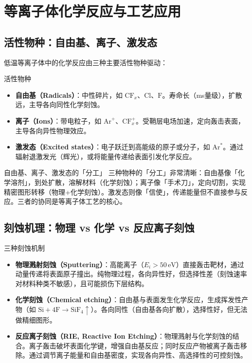 \documentclass[12pt,a4paper,openany,oneside]{book}
\begin{document}
\section{等离子体化学反应与工艺应用}

\subsection{活性物种：自由基、离子、激发态}

低温等离子体中的化学反应由三种主要活性物种驱动：

\begin{definition}{活性物种}{}{}
\label{def:active-species}
\begin{itemize}
\item \textbf{自由基（Radicals）}：中性碎片，如 $\mathrm{CF}_x$、$\mathrm{Cl}$、$\mathrm{F}$。寿命长（ms量级），扩散远，主导各向同性化学刻蚀。
\item \textbf{离子（Ions）}：带电粒子，如 $\mathrm{Ar}^+$、$\mathrm{CF}_x^+$。受鞘层电场加速，定向轰击表面，主导各向异性物理效应。
\item \textbf{激发态（Excited states）}：电子跃迁到高能级的原子或分子，如 $\mathrm{Ar}^*$。通过辐射退激发光（辉光），或将能量传递给表面引发化学反应。
\end{itemize}
\end{definition}

\begin{insight}{自由基、离子、激发态的「分工」}{}
三种物种的「分工」非常清晰：自由基像「化学溶剂」，到处扩散，溶解材料（化学刻蚀）；离子像「手术刀」，定向切割，实现精密图形转移（物理+化学刻蚀）。激发态则像「信使」，传递能量但不直接参与反应。三者的协同是等离子体工艺的核心。
\end{insight}

\subsection{刻蚀机理：物理 vs 化学 vs 反应离子刻蚀}

\begin{definition}{三种刻蚀机制}{}{}
\label{def:etching-mechanisms}
\begin{itemize}
\item \textbf{物理溅射刻蚀（Sputtering）}：高能离子（$E_i > 50\,\mathrm{eV}$）直接轰击靶材，通过动量传递将表面原子撞出。纯物理过程，各向异性好，但选择性差（刻蚀速率对材料种类不敏感），且可能损伤下层结构。
\item \textbf{化学刻蚀（Chemical etching）}：自由基与表面发生化学反应，生成挥发性产物（如 $\mathrm{Si} + 4\mathrm{F} \to \mathrm{SiF}_4\uparrow$）。各向同性（自由基各向扩散），选择性好，但无法做精细图形。
\item \textbf{反应离子刻蚀（RIE, Reactive Ion Etching）}：物理溅射与化学刻蚀的结合。离子轰击破坏表面化学键，增强自由基反应；同时反应产物被离子轰击移除。通过调节离子能量和自由基密度，实现各向异性、高选择性的可控刻蚀。
\end{itemize}
\end{definition}
\end{document}
